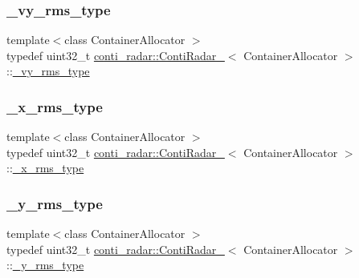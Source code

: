 \subsubsection{\texorpdfstring{\+\_\+vy\+\_\+rms\+\_\+type}{\_vy\_rms\_type}}
{\footnotesize\ttfamily template$<$class Container\+Allocator $>$ \\
typedef uint32\+\_\+t \hyperlink{structconti__radar_1_1ContiRadar__}{conti\+\_\+radar\+::\+Conti\+Radar\+\_\+}$<$ Container\+Allocator $>$\+::\hyperlink{structconti__radar_1_1ContiRadar___a25654e54b73dd98b761e31b5fb022d20}{\+\_\+vy\+\_\+rms\+\_\+type}}

\mbox{\label{structconti__radar_1_1ContiRadar___adcb79fb27779e557e948addd1832938f}} 
\subsubsection{\texorpdfstring{\+\_\+x\+\_\+rms\+\_\+type}{\_x\_rms\_type}}
{\footnotesize\ttfamily template$<$class Container\+Allocator $>$ \\
typedef uint32\+\_\+t \hyperlink{structconti__radar_1_1ContiRadar__}{conti\+\_\+radar\+::\+Conti\+Radar\+\_\+}$<$ Container\+Allocator $>$\+::\hyperlink{structconti__radar_1_1ContiRadar___adcb79fb27779e557e948addd1832938f}{\+\_\+x\+\_\+rms\+\_\+type}}

\mbox{\label{structconti__radar_1_1ContiRadar___ae6571fef76edb2dfe79da331614ddcc5}} 
\subsubsection{\texorpdfstring{\+\_\+y\+\_\+rms\+\_\+type}{\_y\_rms\_type}}
{\footnotesize\ttfamily template$<$class Container\+Allocator $>$ \\
typedef uint32\+\_\+t \hyperlink{structconti__radar_1_1ContiRadar__}{conti\+\_\+radar\+::\+Conti\+Radar\+\_\+}$<$ Container\+Allocator $>$\+::\hyperlink{structconti__radar_1_1ContiRadar___ae6571fef76edb2dfe79da331614ddcc5}{\+\_\+y\+\_\+rms\+\_\+type}}

